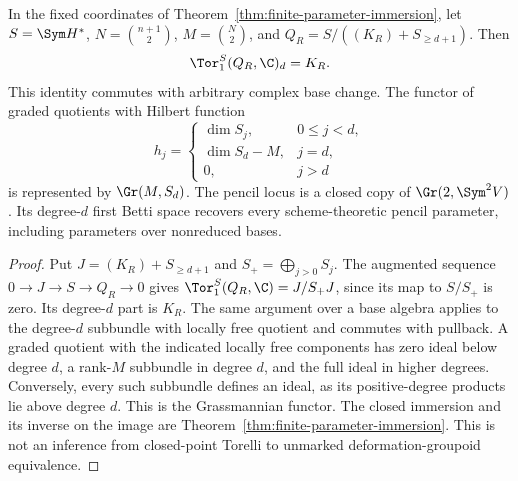 \begin{proposition}
\label{prop:first-syzygy-hilbert}
In the fixed coordinates of Theorem~\ref{thm:finite-parameter-immersion},
let \(S=\Sym H^*\), \(N=\binom{n+1}{2}\), \(M=\binom N2\),
and \(Q_R=S/((K_R)+S_{\ge d+1})\). Then
\begin{equation}\label{eq:first-relation-tor}
                     \Tor_1^S(Q_R,\C)_d=K_R.
\end{equation}
This identity commutes with arbitrary complex base change.
The functor of graded quotients with Hilbert function
\[
 h_j=\begin{cases}\dim S_j,&0\le j<d,\\
 \dim S_d-M,&j=d,\\0,&j>d\end{cases}
\]
is represented by \(\Gr(M,S_d)\). The pencil locus is a closed
copy of \(\Gr(2,\Sym^2V)\). Its degree-\(d\) first Betti
space recovers every scheme-theoretic pencil parameter, including
parameters over nonreduced bases.
\end{proposition}
\begin{proof}
Put \(J=(K_R)+S_{\ge d+1}\) and \(S_+=\bigoplus_{j>0}S_j\).
The augmented sequence \(0\to J\to S\to Q_R\to0\) gives
\(\Tor_1^S(Q_R,\C)=J/S_+J\), since its map to \(S/S_+\)
is zero. Its degree-\(d\) part is \(K_R\). The same argument
over a base algebra applies to the degree-\(d\) subbundle with
locally free quotient and commutes with pullback.
A graded quotient with the indicated locally free components has
zero ideal below degree \(d\), a rank-\(M\) subbundle in degree
\(d\), and the full ideal in higher degrees. Conversely, every
such subbundle defines an ideal, as its positive-degree products lie
above degree \(d\). This is the Grassmannian functor. The closed
immersion and its inverse on the image are
Theorem~\ref{thm:finite-parameter-immersion}. This is not an inference
from closed-point Torelli to unmarked deformation-groupoid equivalence.
\end{proof}
